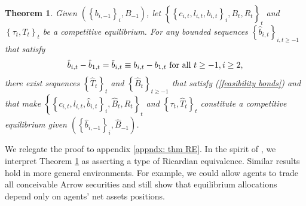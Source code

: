 \documentclass[thmsb,11pt]{article}
\newtheorem{theorem}{Theorem}
\begin{document}
\begin{theorem}
\label{theorem: main} Given $\left( \left \{ b_{i,-1}\right \}
_{i},B_{-1}\right) $, let $\left \{ \left \{ c_{i,t},l_{i,t},b_{i,t}\right \} _{i},B_{t},R_{t}\right \} _{t} $ and $\left \{ \tau _{t},T_{t}\right
\} _{t}$ be a competitive equilibrium. For any bounded sequences $%
\left \{ \hat{b}_{i,t}\right \} _{i,t\geq -1}$ that satisfy
\begin{equation*}
\hat{b}_{i,t}-\hat{b}_{1,t}=\tilde{b}_{i,t}\equiv b_{i,t}	-b_{1,t} \ \text{\rm  for all }t\geq -1,i\geq 2,
\end{equation*}%
there exist  sequences $\left \{ \hat{T}_{t}\right \} _{t}$ and $%
\left \{ \hat{B}_{t}\right \} _{t\geq -1}$ that satisfy (\ref{feasibility
bonds}) and that make $\left \{ \left \{ c_{i,t},l_{i,t},\hat{b}%
_{i,t}\right \} _{i},\hat{B}_{t},R_{t}\right \} _{t}$ and $\left \{
\tau _{t},\hat{T}_{t}\right \} _{t}$ constitute a competitive
equilibrium given $\left( \left \{ \hat{b}_{i,-1}\right \} _{i},\hat{B}%
_{-1}\right) $.
\end{theorem}



We relegate the proof to appendix \ref{appndx: thm RE}. In the spirit of \citet{Barro1974}, we interpret Theorem \ref{theorem: main} as  asserting a type of  Ricardian equivalence.
Similar results  hold in more general environments. For example, we could allow
agents to trade all conceivable  Arrow securities and still show that  equilibrium allocations depend only on agents' net assets positions.
\end{document}
